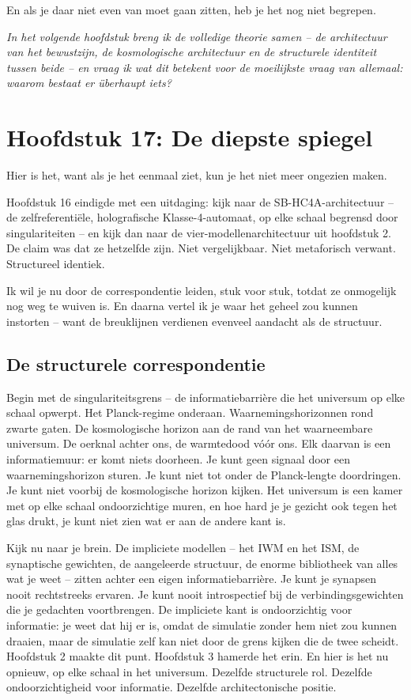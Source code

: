 \documentclass[11pt, twoside, openright]{book}
\begin{document}
En als je daar niet even van moet gaan zitten, heb je het nog niet begrepen.


\textit{In het volgende hoofdstuk breng ik de volledige theorie samen -- de architectuur van het bewustzijn, de kosmologische architectuur en de structurele identiteit tussen beide -- en vraag ik wat dit betekent voor de moeilijkste vraag van allemaal: waarom bestaat er überhaupt iets?}


\chapter*{Hoofdstuk 17: De diepste spiegel}

Hier is het, want als je het eenmaal ziet, kun je het niet meer ongezien maken.

Hoofdstuk 16 eindigde met een uitdaging: kijk naar de SB-HC4A-architectuur -- de zelfreferentiële, holografische Klasse-4-automaat, op elke schaal begrensd door singulariteiten -- en kijk dan naar de vier-modellenarchitectuur uit hoofdstuk 2. De claim was dat ze hetzelfde zijn. Niet vergelijkbaar. Niet metaforisch verwant. Structureel identiek.

Ik wil je nu door de correspondentie leiden, stuk voor stuk, totdat ze onmogelijk nog weg te wuiven is. En daarna vertel ik je waar het geheel zou kunnen instorten -- want de breuklijnen verdienen evenveel aandacht als de structuur.

\section*{De structurele correspondentie}

Begin met de singulariteitsgrens -- de informatiebarrière die het universum op elke schaal opwerpt. Het Planck-regime onderaan. Waarnemingshorizonnen rond zwarte gaten. De kosmologische horizon aan de rand van het waarneembare universum. De oerknal achter ons, de warmtedood vóór ons. Elk daarvan is een informatiemuur: er komt niets doorheen. Je kunt geen signaal door een waarnemingshorizon sturen. Je kunt niet tot onder de Planck-lengte doordringen. Je kunt niet voorbij de kosmologische horizon kijken. Het universum is een kamer met op elke schaal ondoorzichtige muren, en hoe hard je je gezicht ook tegen het glas drukt, je kunt niet zien wat er aan de andere kant is.

Kijk nu naar je brein. De impliciete modellen -- het IWM en het ISM, de synaptische gewichten, de aangeleerde structuur, de enorme bibliotheek van alles wat je weet -- zitten achter een eigen informatiebarrière. Je kunt je synapsen nooit rechtstreeks ervaren. Je kunt nooit introspectief bij de verbindingsgewichten die je gedachten voortbrengen. De impliciete kant is ondoorzichtig voor informatie: je weet dat hij er is, omdat de simulatie zonder hem niet zou kunnen draaien, maar de simulatie zelf kan niet door de grens kijken die de twee scheidt. Hoofdstuk 2 maakte dit punt. Hoofdstuk 3 hamerde het erin. En hier is het nu opnieuw, op elke schaal in het universum. Dezelfde structurele rol. Dezelfde ondoorzichtigheid voor informatie. Dezelfde architectonische positie.
\end{document}
